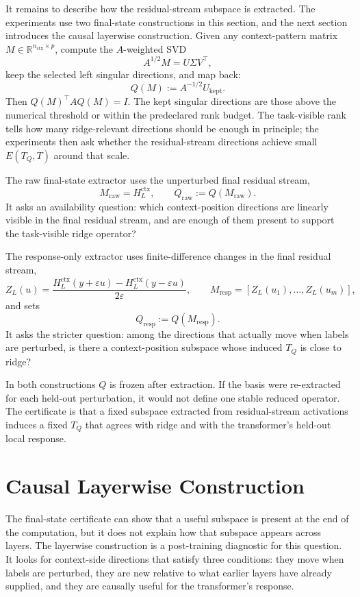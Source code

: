 \documentclass[11pt]{article}
\newcommand{\R}{\mathbb{R}}
\begin{document}
It remains to describe how the residual-stream subspace is extracted. The experiments use two
final-state constructions in this section, and the next section introduces the causal layerwise
construction. Given any context-pattern
matrix \(M\in\R^{n_{\mathrm{ctx}}\times p}\), compute the \(A\)-weighted SVD
\[
A^{1/2}M=U\Sigma V^\top,
\]
keep the selected left singular directions, and map back:
\[
Q(M):=A^{-1/2}U_{\mathrm{kept}}.
\]
Then \(Q(M)^\top A Q(M)=I\). The kept singular directions are those above the numerical threshold
or within the predeclared rank budget. The task-visible rank tells how many ridge-relevant
directions should be enough in principle; the experiments then ask whether the residual-stream
directions achieve small \(E(T_Q,T)\) around that scale.

The raw final-state extractor uses the unperturbed final residual stream,
\[
M_{\mathrm{raw}}=H_L^{\mathrm{ctx}},
\qquad
Q_{\mathrm{raw}}:=Q(M_{\mathrm{raw}}).
\]
It asks an availability question: which context-position directions are linearly visible in the final
residual stream, and are enough of them present to support the task-visible ridge operator?

The response-only extractor uses finite-difference changes in the final residual stream,
\[
Z_L(u)=
\frac{
H_L^{\mathrm{ctx}}(y+\varepsilon u)-H_L^{\mathrm{ctx}}(y-\varepsilon u)
}{2\varepsilon},
\qquad
M_{\mathrm{resp}}=[Z_L(u_1),\ldots,Z_L(u_m)],
\]
and sets
\[
Q_{\mathrm{resp}}:=Q(M_{\mathrm{resp}}).
\]
It asks the stricter question: among the directions that actually move when labels are perturbed,
is there a context-position subspace whose induced \(T_Q\) is close to ridge?

In both constructions \(Q\) is frozen after extraction. If the basis were re-extracted for each
held-out perturbation, it would not define one stable reduced operator. The certificate is that a
fixed subspace extracted from residual-stream activations induces a fixed \(T_Q\) that agrees with
ridge and with the transformer's held-out local response.

\section{Causal Layerwise Construction}

The final-state certificate can show that a useful subspace is present at the end of the computation,
but it does not explain how that subspace appears across layers. The layerwise construction is a
post-training diagnostic for this question. It looks for context-side directions that satisfy three
conditions: they move when labels are perturbed, they are new relative to what earlier layers have
already supplied, and they are causally useful for the transformer's response.
\end{document}
